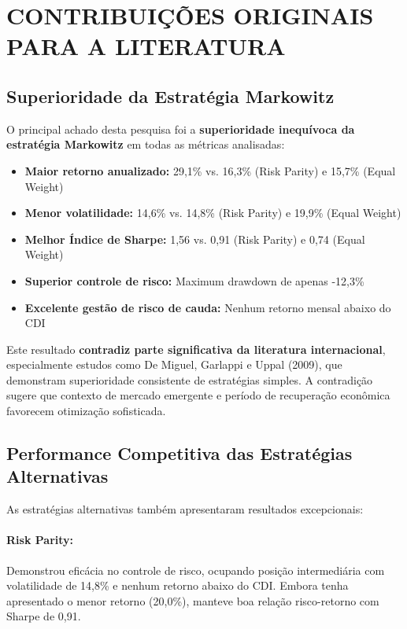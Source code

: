 \section{CONTRIBUIÇÕES ORIGINAIS PARA A LITERATURA}

\subsection{Superioridade da Estratégia Markowitz}

O principal achado desta pesquisa foi a \textbf{superioridade inequívoca da estratégia Markowitz} em todas as métricas analisadas:

\begin{itemize}
    \item \textbf{Maior retorno anualizado:} 29,1\% vs. 16,3\% (Risk Parity) e 15,7\% (Equal Weight)
    \item \textbf{Menor volatilidade:} 14,6\% vs. 14,8\% (Risk Parity) e 19,9\% (Equal Weight)
    \item \textbf{Melhor Índice de Sharpe:} 1,56 vs. 0,91 (Risk Parity) e 0,74 (Equal Weight)
    \item \textbf{Superior controle de risco:} Maximum drawdown de apenas -12,3\%
    \item \textbf{Excelente gestão de risco de cauda:} Nenhum retorno mensal abaixo do CDI
\end{itemize}

Este resultado \textbf{contradiz parte significativa da literatura internacional}, especialmente estudos como De Miguel, Garlappi e Uppal (2009), que demonstram superioridade consistente de estratégias simples. A contradição sugere que contexto de mercado emergente e período de recuperação econômica favorecem otimização sofisticada.

\subsection{Performance Competitiva das Estratégias Alternativas}

As estratégias alternativas também apresentaram resultados excepcionais:

\paragraph{Risk Parity:} Demonstrou eficácia no controle de risco, ocupando posição intermediária com volatilidade de 14,8\% e nenhum retorno abaixo do CDI. Embora tenha apresentado o menor retorno (20,0\%), manteve boa relação risco-retorno com Sharpe de 0,91.

